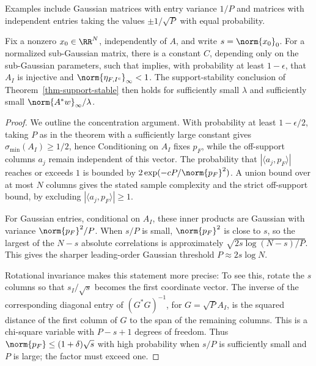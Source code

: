 Examples include Gaussian matrices with entry variance $1/P$ and matrices with independent entries taking the values $\pm1/\sqrt P$ with equal probability.


\begin{thm}\label{thm-cs-etaf}
Fix a nonzero $x_0\in\RR^N$, independently of $A$, and write $s=\norm{x_0}_0$. For a normalized sub-Gaussian matrix, there is a constant $C$, depending only on the sub-Gaussian parameters, such that
implies, with probability at least $1-\epsilon$, that $A_I$ is injective and $\norm{\eta_{F,I^c}}_\infty<1$. The support-stability conclusion of Theorem~\ref{thm-support-stable} then holds for sufficiently small $\lambda$ and sufficiently small $\norm{A^*w}_\infty/\lambda$.
\end{thm}

\begin{proof}
We outline the concentration argument. With probability at least $1-\epsilon/2$, taking $P$ as in the theorem with a sufficiently large constant gives $\sigma_{\min}(A_I)\geq1/2$, hence
Conditioning on $A_I$ fixes $p_F$, while the off-support columns $a_j$ remain independent of this vector. The probability that $|\langle a_j,p_F\rangle|$ reaches or exceeds $1$ is bounded by $2\exp(-cP/\norm{p_F}^2)$. A union bound over at most $N$ columns gives the stated sample complexity and the strict off-support bound, by excluding $|\langle a_j,p_F\rangle|\geq1$.

For Gaussian entries, conditional on $A_I$, these inner products are Gaussian with variance $\norm{p_F}^2/P$. When $s/P$ is small, $\norm{p_F}^2$ is close to $s$, so the largest of the $N-s$ absolute correlations is approximately $\sqrt{2s\log(N-s)/P}$. This gives the sharper leading-order Gaussian threshold $P\approx2s\log N$.

Rotational invariance makes this statement more precise:
To see this, rotate the $s$ columns so that $s_I/\sqrt s$ becomes the first coordinate vector. The inverse of the corresponding diagonal entry of $(G^*G)^{-1}$, for $G=\sqrt P A_I$, is the squared distance of the first column of $G$ to the span of the remaining columns. This is a chi-square variable with $P-s+1$ degrees of freedom. Thus $\norm{p_F}\leq(1+\delta)\sqrt s$ with high probability when $s/P$ is sufficiently small and $P$ is large; the factor must exceed one.
\end{proof}

